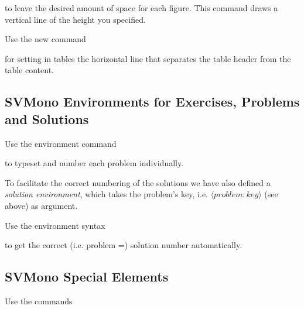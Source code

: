 \documentclass[graybox,square]{svmono}
\begin{document}
\begin{sloppy}
\cprotect{}

to leave the desired amount of space for each figure. This command draws a vertical line of the height you specified.

Use the new command
\cprotect\boxtext{\verb|\svhline|}

for setting in tables the horizontal line that separates the table header from the table content.



\subsection{SVMono Environments for Exercises, Problems and Solutions}

Use the environment command

\cprotect{}

to typeset and number each problem individually.

To facilitate the correct numbering of the solutions we have also defined a {\it solution environment}, which takes the problem's key, i.e. $\langle problem{:}key\rangle$ (see above) as argument.

Use the environment syntax
\cprotect{}

to get the correct (i.e. problem =) solution number automatically.


\subsection{SVMono Special Elements}

Use the commands


\end{sloppy}
\end{document}
